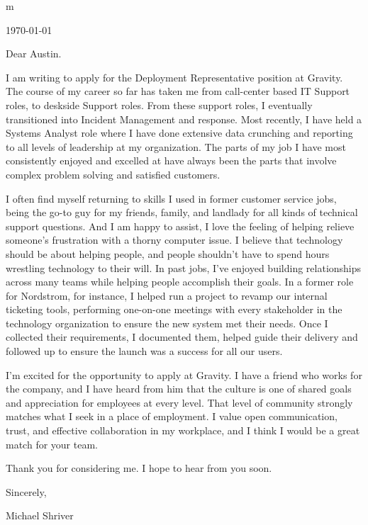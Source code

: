\documentclass[10pt,oneside]{article}
\begin{document}
m

\hfill\dte\today
\heading
\vspace{\baselineskip}
\vspace{\baselineskip}

Dear Austin.

\vspace{\baselineskip}

I am writing to apply for the Deployment Representative position at Gravity. The course of my career so far has taken me from call-center based IT Support roles, to deskside Support roles. From these support roles, I eventually transitioned into Incident Management and response. Most recently, I have held a Systems Analyst role where I have done extensive data crunching and reporting to all levels of leadership at my organization. The parts of my job I have most consistently enjoyed and excelled at have always been the parts that involve complex problem solving and satisfied customers.

\vspace{\baselineskip}

I often find myself returning to skills I used in former customer service jobs, being the go-to guy for my friends, family, and landlady for all kinds of technical support questions. And I am happy to assist, I love the feeling of helping relieve someone’s frustration with a thorny computer issue. I believe that technology should be about helping people, and people shouldn’t have to spend hours wrestling technology to their will. In past jobs, I’ve enjoyed building relationships across many teams while helping people accomplish their goals. In a former role for Nordstrom, for instance, I helped run a project to revamp our internal ticketing tools, performing one-on-one meetings with every stakeholder in the technology organization to ensure the new system met their needs. Once I collected their requirements, I documented them, helped guide their delivery and followed up to ensure the launch was a success for all our users.

\vspace{\baselineskip}

I’m excited for the opportunity to apply at Gravity. I have a friend who works for the company, and I have heard from him that the culture is one of shared goals and appreciation for employees at every level. That level of community strongly matches what I seek in a place of employment. I value open communication, trust, and effective collaboration in my workplace, and I think I would be a great match for your team.

\vspace{\baselineskip}

Thank you for considering me. I hope to hear from you soon.

\vspace{\baselineskip}

Sincerely,

\vspace{\baselineskip}

Michael Shriver
\end{document}
